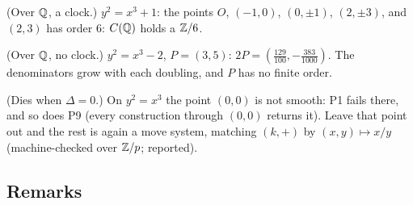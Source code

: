 \begin{lines}
\item[\lab{P11}] (Over $\mathbb{Q}$, a clock.) $y^2 = x^3 + 1$: the points $O$, $(-1, 0)$, $(0, \pm 1)$, $(2, \pm 3)$, and $(2, 3)$ has order $6$: $C(\mathbb{Q})$ holds a $\mathbb{Z}/6$.
\item[\lab{P12}] (Over $\mathbb{Q}$, no clock.) $y^2 = x^3 - 2$, $P = (3, 5)$: $2P = (\tfrac{129}{100}, -\tfrac{383}{1000})$. The denominators grow with each doubling, and $P$ has no finite order.
\item[\lab{P13}] (Dies when $\Delta = 0$.) On $y^2 = x^3$ the point $(0, 0)$ is not smooth: P1 fails there, and so does P9 (every construction through $(0, 0)$ returns it). Leave that point out and the rest is again a move system, matching $(k, +)$ by $(x, y) \mapsto x / y$ (machine-checked over $\mathbb{Z}/p$; reported).
\end{lines}

\subsection*{Remarks}

